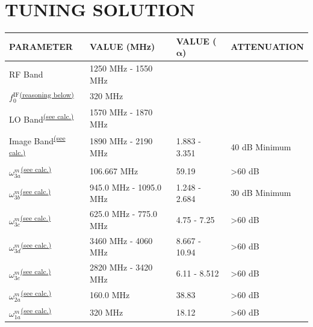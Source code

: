 \section{TUNING SOLUTION}
\begin{table}[H]
    \centering
    \begin{tabular}{|C{3.5cm}|C{4.3cm}|C{2.4cm}|C{4.2cm}|}
        \hline
        \textbf{PARAMETER} & \textbf{VALUE (MHz)} & \textbf{VALUE ($\boldsymbol{\alpha}$)} & \textbf{ATTENUATION} \\
        \hline
        RF Band & 1250 MHz - 1550 MHz & & \\
        \hline
        $f_{0}^{\text{IF}}$\textsuperscript{\hyperref[sec:IF-center]{(reasoning below)}} & 320 MHz & & \\
        \hline
        LO Band\textsuperscript{\hyperref[eq:LO]{(see calc.)}} & 1570 MHz - 1870 MHz & & \\
        \hline
        \hline
        Image Band\textsuperscript{\hyperref[eq:image-derivation]{(see calc.)}} & 1890 MHz - 2190 MHz & 1.883 - 3.351 & 40 dB Minimum \\
        \hline
        $\omega_{3a}^m$\textsuperscript{\hyperref[eq:3a]{(see calc.)}} & 106.667 MHz & 59.19 & >60 dB \\
        \hline
        $\omega_{3b}^m$\textsuperscript{\hyperref[eq:3b]{(see calc.)}} & 945.0 MHz - 1095.0 MHz & 1.248 - 2.684 & 30 dB Minimum \\
        \hline
        $\omega_{3c}^m$\textsuperscript{\hyperref[eq:3c]{(see calc.)}} & 625.0 MHz - 775.0 MHz & 4.75 - 7.25 & >60 dB \\
        \hline
        $\omega_{3d}^m$\textsuperscript{\hyperref[eq:3d]{(see calc.)}} & 3460 MHz - 4060 MHz & 8.667 - 10.94 & >60 dB \\
        \hline
        $\omega_{3e}^m$\textsuperscript{\hyperref[eq:3e]{(see calc.)}} & 2820 MHz - 3420 MHz & 6.11 - 8.512 & >60 dB \\
        \hline
         $\omega_{2a}^m$\textsuperscript{\hyperref[eq:2a]{(see calc.)}} & 160.0 MHz & 38.83  & >60 dB \\
        \hline
         $\omega_{1a}^m$\textsuperscript{\hyperref[eq:1a]{(see calc.)}} & 320 MHz & 18.12 & >60 dB \\
        \hline
    \end{tabular}
\end{table}

